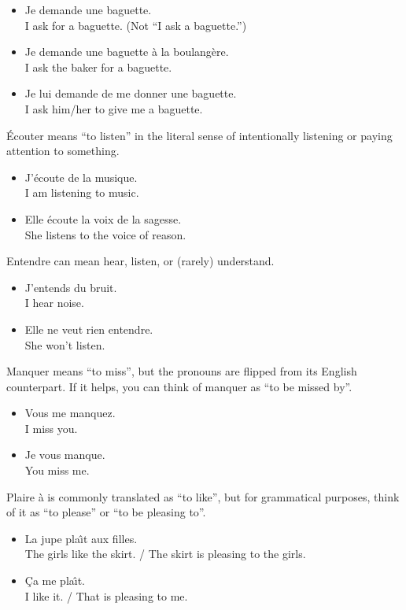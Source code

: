 \begin{itemize}
  \item  Je demande une baguette. \\ I ask for a baguette. (Not ``I ask a baguette.'')
	\item  Je demande une baguette {\`a} la boulang{\`e}re. \\ I ask the baker for a baguette.
	\item  Je lui demande de me donner une baguette. \\ I ask him/her to give me a baguette.
\end{itemize}

{\'E}couter means ``to listen'' in the literal sense of intentionally listening or paying attention to something.

\begin{itemize}
  \item  J'{\'e}coute de la musique. \\ I am listening to music.
	\item  Elle {\'e}coute la voix de la sagesse. \\ She listens to the voice of reason.
\end{itemize}

Entendre can mean hear, listen, or (rarely) understand.

\begin{itemize}
  \item  J'entends du bruit. \\ I hear noise.
	\item  Elle ne veut rien entendre. \\ She won't listen.
\end{itemize}

Manquer means ``to miss'', but the pronouns are flipped from its English counterpart. If it helps, you can think of manquer as ``to be missed by''.

\begin{itemize}
  \item  Vous me manquez. \\ I miss you.
	\item  Je vous manque. \\ You miss me.
\end{itemize}

Plaire {\`a} is commonly translated as ``to like'', but for grammatical purposes, think of it as ``to please'' or ``to be pleasing to''.

\begin{itemize}
  \item  La jupe pla\^{\i}t aux filles. \\ The girls like the skirt. / The skirt is pleasing to the girls.
	\item  {\c C}a me pla\^{\i}t. \\ I like it. / That is pleasing to me.
\end{itemize}

